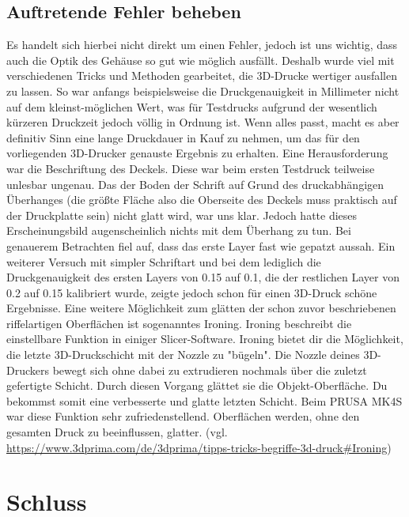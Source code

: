 \documentclass[11pt, twoside]{article}
\begin{document}
\subsection{Auftretende Fehler beheben}
Es handelt sich hierbei nicht direkt um einen Fehler, jedoch ist uns wichtig, dass auch die Optik des Gehäuse so gut wie möglich ausfällt. Deshalb wurde viel mit verschiedenen Tricks und Methoden gearbeitet, die 3D-Drucke wertiger ausfallen zu lassen.\newline
So war anfangs beispielsweise die Druckgenauigkeit in Millimeter nicht auf dem kleinst-möglichen Wert, was für Testdrucks aufgrund der wesentlich kürzeren Druckzeit jedoch völlig in Ordnung ist. Wenn alles passt, macht es aber definitiv Sinn eine lange Druckdauer in Kauf zu nehmen, um das für den vorliegenden 3D-Drucker genauste Ergebnis zu erhalten.\newline
Eine Herausforderung war die Beschriftung des Deckels. Diese war beim ersten Testdruck teilweise unlesbar ungenau. Das der \glqq Boden\grqq{} der Schrift auf Grund des druckabhängigen Überhanges (die größte Fläche also die Oberseite des Deckels muss praktisch auf der Druckplatte sein) nicht glatt wird, war uns klar. Jedoch hatte dieses Erscheinungsbild augenscheinlich nichts mit dem Überhang zu tun. Bei genauerem Betrachten fiel auf, dass das erste Layer fast wie gepatzt aussah. Ein weiterer Versuch mit simpler Schriftart und bei dem lediglich die Druckgenauigkeit des ersten Layers von 0.15 auf 0.1, die der restlichen Layer von 0.2 auf 0.15 kalibriert wurde, zeigte jedoch schon für einen 3D-Druck schöne Ergebnisse.\newline
Eine weitere Möglichkeit zum glätten der schon zuvor beschriebenen riffelartigen Oberflächen ist sogenanntes Ironing. \glqq Ironing beschreibt die einstellbare Funktion in einiger Slicer-Software. Ironing bietet dir die Möglichkeit, die letzte 3D-Druckschicht mit der Nozzle zu "bügeln". Die Nozzle deines 3D-Druckers bewegt sich ohne dabei zu extrudieren nochmals über die zuletzt gefertigte Schicht. Durch diesen Vorgang glättet sie die Objekt-Oberfläche. Du bekommst somit eine verbesserte und glatte letzten Schicht.\grqq{} Beim PRUSA MK4S war diese Funktion sehr zufriedenstellend. Oberflächen werden, ohne den gesamten Druck zu beeinflussen, glatter.\newline
\vspace{4mm}\newline
(vgl. \url{https://www.3dprima.com/de/3dprima/tipps-tricks-begriffe-3d-druck#Ironing})
\newpage
\section{Schluss}
\end{document}
